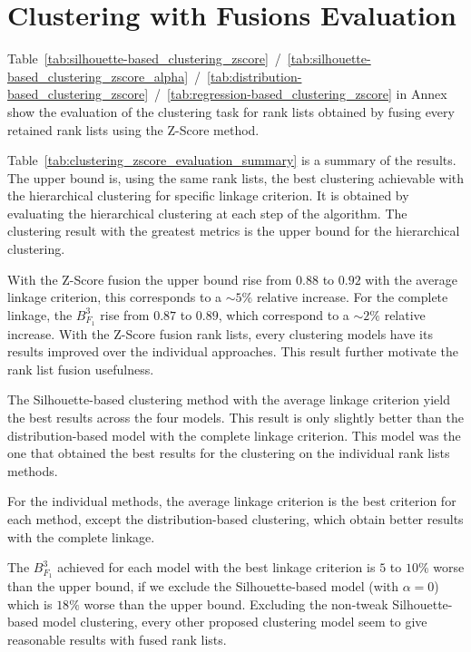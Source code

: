 \section{Clustering with Fusions Evaluation}

Table~\ref{tab:silhouette-based_clustering_zscore}~/~\ref{tab:silhouette-based_clustering_zscore_alpha}~/~\ref{tab:distribution-based_clustering_zscore}~/~\ref{tab:regression-based_clustering_zscore} in Annex show the evaluation of the clustering task for rank lists obtained by fusing every retained rank lists using the Z-Score method.

Table~\ref{tab:clustering_zscore_evaluation_summary} is a summary of the results.
The upper bound is, using the same rank lists, the best clustering achievable with the hierarchical clustering for specific linkage criterion.
It is obtained by evaluating the hierarchical clustering at each step of the algorithm.
The clustering result with the greatest metrics is the upper bound for the hierarchical clustering.

With the Z-Score fusion the upper bound rise from $0.88$ to $0.92$ with the average linkage criterion, this corresponds to a $\sim 5\%$ relative increase.
For the complete linkage, the $B^{3}_{F_1}$ rise from $0.87$ to $0.89$, which correspond to a $\sim 2\%$ relative increase.
With the Z-Score fusion rank lists, every clustering models have its results improved over the individual approaches.
This result further motivate the rank list fusion usefulness.

The Silhouette-based clustering method with the average linkage criterion yield the best results across the four models.
This result is only slightly better than the distribution-based model with the complete linkage criterion.
This model was the one that obtained the best results for the clustering on the individual rank lists methods.

For the individual methods, the average linkage criterion is the best criterion for each method, except the distribution-based clustering, which obtain better results with the complete linkage.

The $B^{3}_{F_1}$ achieved for each model with the best linkage criterion is $5$ to $10\%$ worse than the upper bound, if we exclude the Silhouette-based model (with $\alpha = 0$) which is $18\%$ worse than the upper bound.
Excluding the non-tweak Silhouette-based model clustering, every other proposed clustering model seem to give reasonable results with fused rank lists.

